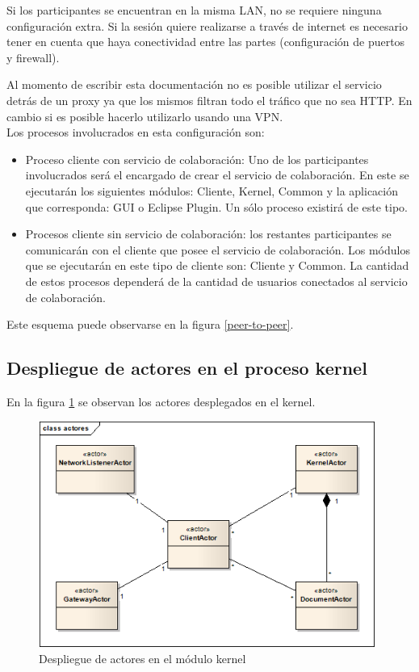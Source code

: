 \documentclass[12pt,a4paper]{article}
\begin{document}
Si los participantes se encuentran en la misma LAN, no se requiere ninguna configuración extra. Si la sesión quiere realizarse
a través de internet es necesario tener en cuenta que haya conectividad entre las partes (configuración de puertos y firewall).

Al momento de escribir esta documentación no es posible utilizar el servicio detrás de un proxy ya que los mismos
filtran todo el tráfico que no sea HTTP. En cambio si es posible hacerlo utilizarlo usando una VPN. \\

Los procesos involucrados en esta configuración son:
\begin{itemize}
	\item Proceso cliente con servicio de colaboración: Uno de los participantes involucrados será el encargado de crear el
	servicio de colaboración. En este se ejecutarán los siguientes módulos: Cliente, Kernel, Common y la aplicación que
	corresponda: GUI o Eclipse Plugin. Un sólo proceso existirá de este tipo.
	\item Procesos cliente sin servicio de colaboración: los restantes participantes se comunicarán con el cliente que posee
	el servicio de colaboración. Los módulos que se ejecutarán en este tipo de cliente son: Cliente y Common. La cantidad de
	estos procesos dependerá de la cantidad de usuarios conectados al servicio de colaboración.
\end{itemize}

Este esquema puede observarse en la figura \ref{peer-to-peer}.

\subsection{Despliegue de actores en el proceso kernel}

En la figura \ref{actores-kernel} se observan los actores desplegados en el kernel.

	\begin{figure}[!ht]
		\begin{center}
			\includegraphics[width=11cm]{actores-kernel.png}
			\caption{\label{actores-kernel} Despliegue de actores en el módulo kernel }
		\end{center}
	\end{figure}
\end{document}
